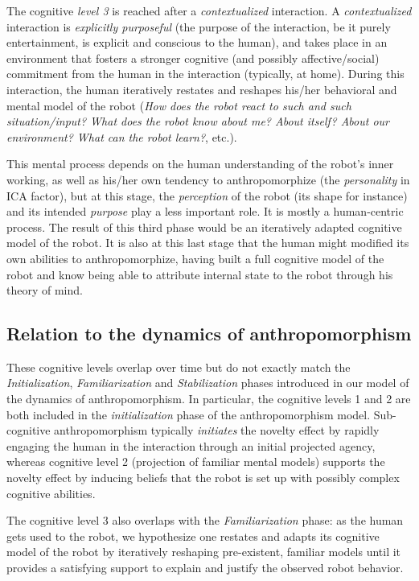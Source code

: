 \documentclass{frontiersSCNS} %
\begin{document}
The cognitive \emph{level 3} is reached after a \emph{contextualized} interaction.
A \emph{contextualized} interaction is \emph{explicitly purposeful} (the purpose
of the interaction, be it purely entertainment, is explicit and conscious to the
human), and takes place in an environment that fosters a stronger cognitive (and
possibly affective/social) commitment from the human in the interaction
(typically, at home). During this interaction, the human iteratively restates
and reshapes his/her behavioral and mental model of the robot (\emph{How does
the robot react to such and such situation/input?  What does the robot know
about me? About itself? About our environment? What can the robot learn?}, etc.).

This mental process depends on the human understanding of the robot's
inner working, as well as his/her own tendency to anthropomorphize (the
\emph{personality} in ICA factor), but at this
stage, the \emph{perception} of the robot (its shape for instance) and its
intended \emph{purpose} play a less important role. It is mostly a human-centric
process.  The result of this third phase would be an iteratively adapted
cognitive model of the robot. It is also at this last stage that the human might
modified its own abilities to anthropomorphize, having built a full cognitive
model of the robot and know being able to attribute internal state to the robot
through his theory of mind.


\subsection{Relation to the dynamics of anthropomorphism}

These cognitive levels overlap over time but do not exactly match the
\emph{Initialization}, \emph{Familiarization} and \emph{Stabilization} phases
introduced in our model of the dynamics of anthropomorphism. In particular,
the cognitive levels 1 and 2 are both included in the \emph{initialization} phase
of the anthropomorphism model. Sub-cognitive anthropomorphism typically
\emph{initiates} the novelty effect by rapidly engaging the human in the
interaction through an initial projected agency, whereas cognitive level 2
(projection of familiar mental models) supports the novelty effect by inducing
beliefs that the robot is set up with possibly complex cognitive abilities.

The cognitive level 3 also overlaps with the \emph{Familiarization} phase: as
the human gets used to the robot, we hypothesize one restates and adapts its
cognitive model of the robot by iteratively reshaping pre-existent, familiar
models until it provides a satisfying support to explain and justify the
observed robot behavior.
\end{document}
